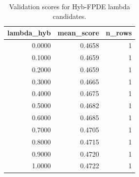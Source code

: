 \begin{table}[t]
\caption{Validation scores for Hyb-FPDE lambda candidates.}
\label{tab:lambda_distribution_computed}
\centering
\begin{tabular}{rrr}
\toprule
lambda\_hyb & mean\_score & n\_rows \\
\midrule
0.0000 & 0.4658 & 1 \\
0.1000 & 0.4659 & 1 \\
0.2000 & 0.4659 & 1 \\
0.3000 & 0.4665 & 1 \\
0.4000 & 0.4675 & 1 \\
0.5000 & 0.4682 & 1 \\
0.6000 & 0.4685 & 1 \\
0.7000 & 0.4705 & 1 \\
0.8000 & 0.4715 & 1 \\
0.9000 & 0.4720 & 1 \\
1.0000 & 0.4722 & 1 \\
\bottomrule
\end{tabular}

\end{table}
